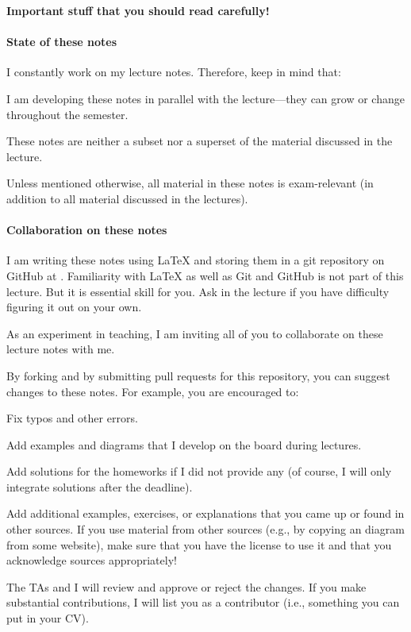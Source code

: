 \begin{center}
\textbf{Important stuff that you should read carefully!}
\end{center}

\paragraph{State of these notes}
I constantly work on my lecture notes.
Therefore, keep in mind that:
\begin{compactitem}
\item I am developing these notes in parallel with the lecture---they can grow or change throughout the semester.
\item These notes are neither a subset nor a superset of the material discussed in the lecture.
\item Unless mentioned otherwise, all material in these notes is exam-relevant (in addition to all material discussed in the lectures).
\end{compactitem}
\medskip

\paragraph{Collaboration on these notes}
I am writing these notes using LaTeX and storing them in a git repository on GitHub at \cite{}.
Familiarity with LaTeX as well as Git and GitHub is not part of this lecture. But it is essential skill for you.
Ask in the lecture if you have difficulty figuring it out on your own.
\medskip

As an experiment in teaching, I am inviting all of you to collaborate on these lecture notes with me.
\medskip

By forking and by submitting pull requests for this repository, you can suggest changes to these notes.
For example, you are encouraged to:
\begin{compactitem}
\item Fix typos and other errors.
\item Add examples and diagrams that I develop on the board during lectures.
\item Add solutions for the homeworks if I did not provide any (of course, I will only integrate solutions after the deadline).
\item Add additional examples, exercises, or explanations that you came up or found in other sources.
 If you use material from other sources (e.g., by copying an diagram from some website), make sure that you have the license to use it and that you acknowledge sources appropriately!
\end{compactitem}
The TAs and I will review and approve or reject the changes.
If you make substantial contributions, I will list you as a contributor (i.e., something you can put in your CV).
\medskip

